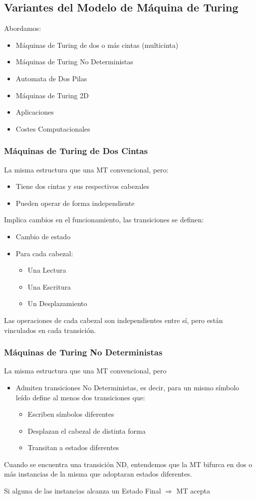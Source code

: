 \subsection{Variantes del Modelo de Máquina de Turing}
Abordamos:
\begin{itemize}
    \item Máquinas de Turing de dos o más cintas (multicinta)
    \item Máquinas de Turing No Deterministas
    \item Automata de Dos Pilas
    \item Máquinas de Turing 2D
    \item Aplicaciones
    \item Costes Computacionales
\end{itemize}

\subsubsection{Máquinas de Turing de Dos Cintas}
La misma estructura que una MT convencional, pero:
\begin{itemize}
    \item Tiene dos cintas y sus respectivos cabezales
    \item Pueden operar de forma independiente
\end{itemize}

Implica cambios en el funcionamiento, las transiciones se definen:
\begin{itemize}
    \item Cambio de estado
    \item Para cada cabezal:
    \begin{itemize}
        \item Una Lectura
        \item Una Escritura
        \item Un Desplazamiento
    \end{itemize}
\end{itemize}

Las operaciones de cada cabezal son independientes entre sí, pero están vinculados en cada transición.

\subsubsection{Máquinas de Turing No Deterministas}
La misma estructura que una MT convencional, pero
\begin{itemize}
    \item Admiten transiciones No Deterministas, es decir, para un mismo símbolo leído define al menos dos transiciones que:
    \begin{itemize}
        \item Escriben símbolos diferentes
        \item Desplazan el cabezal de distinta forma
        \item Transitan a estados diferentes
    \end{itemize}
\end{itemize}

Cuando se encuentra una transición ND, entendemos que la MT bifurca en dos o más instancias de la misma que adoptaran estados diferentes.

Si alguna de las instancias alcanza un Estado Final $\Rightarrow$ MT acepta